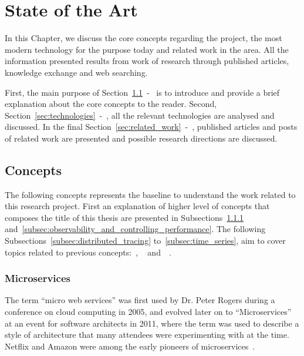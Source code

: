 \glsresetall
\chapter{State of the Art}
\label{chap:state_of_the_art}

In this Chapter, we discuss the core concepts regarding the project, the most modern technology for the purpose today and related work in the area. All the information presented results from work of research through published articles, knowledge exchange and web searching.

First, the main purpose of Section~\ref{sec:concepts}~-~ is to introduce and provide a brief explanation about the core concepts to the reader. Second, Section~\ref{sec:technologies}~-~, all the relevant technologies are analysed and discussed. In the final Section~\ref{sec:related_work}~-~, published articles and posts of related work are presented and possible research directions are discussed.

\section{Concepts}
\label{sec:concepts}

The following concepts represents the baseline to understand the work related to this research project. First an explanation of higher level of concepts that composes the title of this thesis are presented in Subsections~\ref{subsec:microservices} and~\ref{subsec:observability_and_controlling_performance}. The following Subsections~\ref{subsec:distributed_tracing} to~\ref{subsec:time_series}, aim to cover topics  related to previous concepts:~, ~ and~~.

\subsection{Microservices}
\label{subsec:microservices}

The term ``micro web services'' was first used by Dr. Peter Rogers during a conference on cloud computing in 2005, and evolved later on to ``Microservices'' at an event for software architects in 2011, where the term was used to describe a style of architecture that many attendees were experimenting with at the time. Netflix and Amazon were among the early pioneers of microservices~\cite{MauersbergerMicroservices}.

